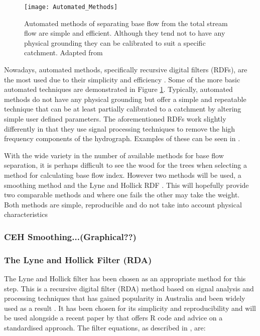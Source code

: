 \documentclass[DIV=calc, paper=a4, fontsize=11pt, twocolumn]{scrartcl}	 %
\begin{document}
\begin{figure}[t!]
	\texttt{[image: Automated\_Methods]}
	\centering
	\caption[TOC caption]{Automated methods of separating base flow from the total stream flow are simple and efficient. Although they tend not to have any physical grounding they can be calibrated to suit a specific catchment. Adapted from \citep{Sloto1996}}
	\label{fig:Automated}
\end{figure}

Nowadays, automated methods, specifically recursive digital filters (RDFs), are the most used  due to their simplicity and efficiency \citet{Li2013}. Some of the more basic automated techniques are demonstrated in Figure \ref{fig:Automated}. Typically, automated methods do not have any physical grounding but offer a simple and repeatable technique \citep{Brodie2005} that can be at least partially calibrated to a catchment by altering simple user defined parameters. The aforementioned RDFs work slightly differently in that they use signal processing techniques to remove the high frequency components of the hydrograph. Examples of these can be seen in \citet{Brodie2005}.

With the wide variety in the number of available methods for base flow separation, it is perhaps difficult to see the wood for the trees when selecting a method for calculating base flow index. However two methods will be used, a smoothing method and the Lyne and Hollick RDF \citep{Lyne1979}. This will hopefully provide two comparable methods and where one fails the other may take the weight. Both methods are simple, reproducible and do not take into account physical characteristics

\subsubsection{CEH Smoothing...(Graphical??)}

\subsubsection{The Lyne and Hollick Filter (RDA)}
The Lyne and Hollick filter \citep{Lyne1979} has been chosen as an appropriate method for this step. This is a recursive digital filter (RDA) method based on signal analysis and processing techniques \citep{Lyne1979} that has gained popularity in Australia \citep{Chapman1991} and been widely used as a result \citep{Ladson2013}. It has been chosen for its simplicity and reproducibility and will be used alongside a recent paper by \citet{Ladson2013} that offers R code and advice on a standardised approach. The filter equations, as described in \citet{Ladson2013}, are:
\end{document}
